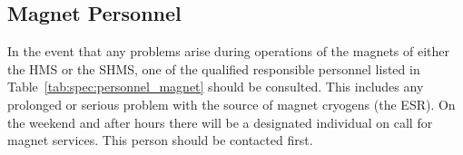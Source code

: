 {\subsection {Magnet Personnel}
In the event that any problems arise during operations of the magnets
of either the HMS or the SHMS,
one of the qualified responsible personnel listed in 
Table~\ref{tab:spec:personnel_magnet} should be consulted.  This includes any prolonged
or serious problem with the source of magnet cryogens (the ESR).
On the weekend and after hours there
will be a designated individual on call for magnet services. This person should be
contacted first. 


%
%
%
}
